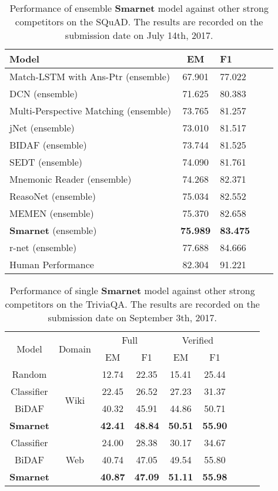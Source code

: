 \documentclass[letterpaper]{article} %
\begin{document}
 \begin{table}[!t]
	\centering
	\begin{tabular}{lclcl}
		\toprule
		Model & EM &F1 \\
		\midrule
		Match-LSTM with Ans-Ptr (ensemble) &67.901 &77.022 \\
		DCN (ensemble) &71.625 &80.383 \\
		Multi-Perspective Matching (ensemble) &73.765 &81.257 \\
		jNet (ensemble) &73.010 &81.517 \\
	    BIDAF (ensemble) &73.744 &81.525 \\
		SEDT (ensemble) &74.090 &81.761 \\
		Mnemonic Reader (ensemble) &74.268 &82.371 \\
		ReasoNet (ensemble) &75.034 &82.552 \\
		MEMEN (ensemble) &75.370 &82.658 \\
		\textbf{Smarnet} (ensemble) &\textbf{75.989} &\textbf{83.475} \\
		r-net (ensemble) &77.688 &84.666\\
		\midrule
		Human Performance &82.304        &91.221  \\
		\bottomrule	
	\end{tabular}
\caption{Performance of ensemble \textbf{Smarnet} model against other strong competitors on the SQuAD. The results are recorded on the submission date on July 14th, 2017.}
\end{table}
\begin{table}[!t]
\centering
\begin{tabular}{c|c|c|c|c|clcl}
	\hline
	\multirow{2}{*}{Model} &\multirow{2}{*}{Domain} & \multicolumn{2}{|c|}{Full} & \multicolumn{2}{|c}{Verified} \\
	\cline{3-6}
	&& EM & F1  & EM & F1 \\
	\hline
	Random &\multirow{4}{*}{Wiki}& 12.74& 22.35 & 15.41 & 25.44 \\
	Classifier && 22.45 & 26.52 & 27.23 & 31.37 \\
	BiDAF && 40.32 & 45.91 & 44.86 & 50.71 \\
	\textbf{Smarnet} && \textbf{42.41} & \textbf{48.84} & \textbf{50.51} & \textbf{55.90} \\
	\hline
	Classifier &\multirow{3}{*}{Web}& 24.00 & 28.38 & 30.17 & 34.67 \\
	BiDAF && 40.74 & 47.05 & 49.54 & 55.80 \\
	\textbf{Smarnet} && \textbf{40.87} & \textbf{47.09} & \textbf{51.11} & \textbf{55.98} \\
	\hline
\end{tabular}
\caption{Performance of single \textbf{Smarnet} model against other strong competitors on the TriviaQA. The results are recorded on the submission date on September 3th, 2017.}
\end{table}
\end{document}
